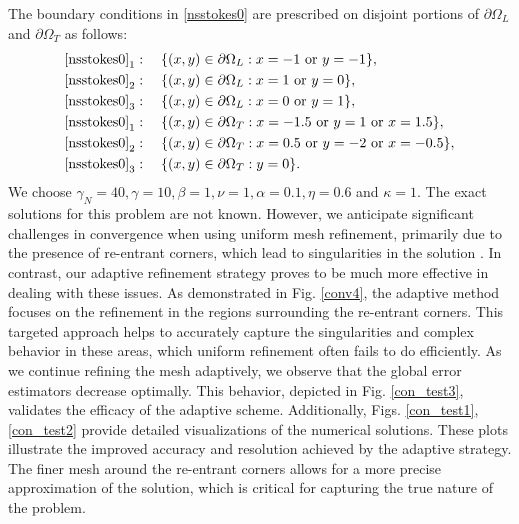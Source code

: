 \documentclass[10pt,a4paper]{article}
\begin{document}
The boundary conditions in \eqref{nsstokes0} are prescribed on disjoint portions of $\partial \Omega_L$ and $\partial \Omega_T$ as follows:
\begin{align*}
\eqref{nsstokes0}_1 &:\quad \{ (x,y) \in \partial \Omega_L : x = -1 \text{ or } y = -1 \}, \\
\eqref{nsstokes0}_2 &:\quad \{ (x,y) \in \partial \Omega_L : x = 1 \text{ or } y = 0 \}, \\
\eqref{nsstokes0}_3 &:\quad \{ (x,y) \in \partial \Omega_L : x = 0 \text{ or } y = 1 \},
\\
\eqref{nsstokes0}_1 &:\quad \{ (x,y) \in \partial \Omega_T : x = -1.5 \text{ or } y = 1 \text{ or } x = 1.5\}, \\
\eqref{nsstokes0}_2 &:\quad \{ (x,y) \in \partial \Omega_T : x = 0.5 \text{ or } y = -2 \text{ or } x = -0.5 \}, \\
\eqref{nsstokes0}_3 &:\quad \{ (x,y) \in \partial \Omega_T :  y = 0 \}.
\end{align*}
We choose $\gamma_N=40, \gamma =10, \beta=1, \nu=1, \alpha=0.1, \eta = 0.6$ and $ \kappa=1$. The exact solutions for this problem are not
known. However, we anticipate significant challenges in convergence when using uniform mesh refinement, primarily due to the presence of re-entrant corners, which lead to singularities in the solution \cite{choi2013stationary}. In contrast, our adaptive refinement strategy proves to be much more effective in dealing with these issues. As demonstrated in Fig. \ref{conv4}, the adaptive method focuses on the refinement in the regions surrounding the re-entrant corners. This targeted approach helps to accurately capture the singularities and complex behavior in these areas, which uniform refinement often fails to do efficiently. As we continue refining the mesh adaptively, we observe that the global error estimators decrease optimally. This behavior, depicted in Fig. \ref{con_test3}, validates the efficacy of the adaptive
scheme. Additionally, Figs. \ref{con_test1}, \ref{con_test2} provide detailed visualizations of the numerical solutions. These plots illustrate the improved accuracy and resolution achieved by the adaptive strategy. The finer mesh around the re-entrant corners allows for a more precise approximation of the solution, which is critical for capturing the true nature of the problem.
\end{document}
